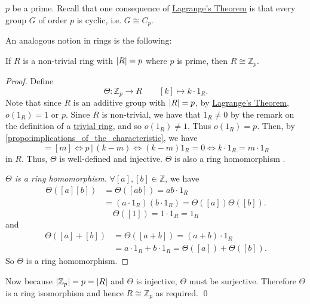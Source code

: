  $p$ be a prime. Recall that one consequence of \hyperref[thm:lagrange_s_theorem]{Lagrange's Theorem} is that every group $G$ of order $p$ is cyclic, i.e. $G \cong C_p$.

An analogous notion in rings is the following:

\begin{propo}
\label{propo:ring_with_prime_order_is_isomorphic_to_integer_modulo_prime}
  If $R$ is a non-trivial ring with $\left|R\right| = p$ where $p$ is prime, then $R \cong \mathbb{Z}_p$.
\end{propo}

\begin{proof}
  Define
  \begin{equation*}
    \Theta : \mathbb{Z}_p \to R \qquad [k] \mapsto k \cdot 1_R.
  \end{equation*}
  Note that since $R$ is an additive group with $\left|R\right| = p$, by \hyperref[thm:lagrange_s_theorem]{Lagrange's Theorem}, $o(1_R) = 1$ or $p$. Since $R$ is non-trivial, we have that $1_R \neq 0$ by the remark on the definition of a \hyperref[defn:trivial_ring]{trivial ring}, and so $o(1_R) \neq 1$. Thus $o(1_R) = p$. Then, by \cref{propo:implications_of_the_characteristic}, we have
  \begin{equation*}
    [k] = [m] \iff p \, | \, (k - m) \iff (k - m) 1_R = 0 \iff k \cdot 1_R = m \cdot 1_R
  \end{equation*}
  in $R$. Thus, $\Theta$ is well-defined and injective. $\Theta$ is also a ring homomorphism .

  \begin{proof}[$\Theta$ is a ring homomorphism]
    $\forall [a], [b] \in \mathbb{Z}$, we have
    \begin{align*}
      \Theta([a][b]) &= \Theta( [ab] ) = ab \cdot 1_R \\
                     &= ( a \cdot 1_R )( b \cdot 1_R ) = \Theta([a])\Theta([b]).
    \end{align*}
    \begin{equation*}
      \Theta([1]) = 1 \cdot 1_R = 1_R
    \end{equation*}
    and
    \begin{align*}
      \Theta([a] + [b]) &= \Theta([ a + b ]) = (a + b) \cdot 1_R \\
                        &= a \cdot 1_R + b \cdot 1_R = \Theta([a]) + \Theta([b]).
    \end{align*}
    So $\Theta$ is a ring homomorphism.
  \end{proof}
  Now because $\left|\mathbb{Z}_p\right| = p = \left|R\right|$ and $\Theta$ is injective, $\Theta$ must be surjective. Therefore $\Theta$ is a ring isomorphism and hence $R \cong \mathbb{Z}_p$ as required. \qed
\end{proof}


